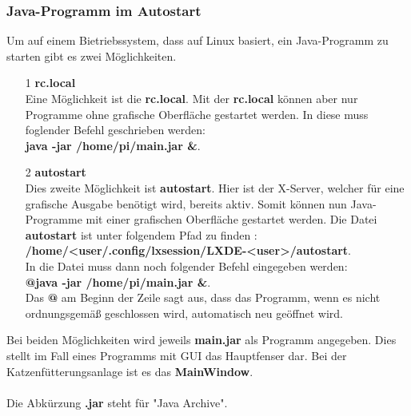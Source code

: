 \subsubsection{Java-Programm im Autostart}\label{subsubsec:Autostart}
Um auf einem Bietriebssystem, dass auf Linux basiert, ein Java-Programm zu starten gibt es zwei Möglichkeiten.
\begin{itemize}
\item[1] \textbf{rc.local}
\\ Eine Möglichkeit ist die \textbf{rc.local}. Mit der \textbf{rc.local} können aber nur Programme ohne grafische Oberfläche gestartet werden. In diese muss foglender Befehl geschrieben werden: 
\\ \textbf{java -jar /home/pi/main.jar \&}.
\item[2] \textbf{autostart}
\\ Dies zweite Möglichkeit ist \textbf{autostart}. Hier ist der X-Server, welcher für eine grafische Ausgabe benötigt wird, bereits aktiv. Somit können nun Java-Programme mit einer grafischen Oberfläche gestartet werden. Die Datei \textbf{autostart} ist unter folgendem Pfad zu finden : 
\\ \textbf{/home/<user/.config/lxsession/LXDE-<user>/autostart}. 
\\ In die Datei muss dann noch folgender Befehl eingegeben werden: 
\\ \textbf{@java -jar /home/pi/main.jar \&}.
\\Das \textbf{@} am Beginn der Zeile sagt aus, dass das Programm, wenn es nicht ordnungsgemäß geschlossen wird, automatisch neu geöffnet wird.
\end{itemize} 
Bei beiden Möglichkeiten wird jeweils \textbf{main.jar} als Programm angegeben. Dies stellt im Fall eines Programms mit GUI das Hauptfenser dar. Bei der Katzenfütterungsanlage ist es das \textbf{MainWindow}.
\\ \\ Die Abkürzung \textbf{.jar} steht für "Java Archive".

\newpage

